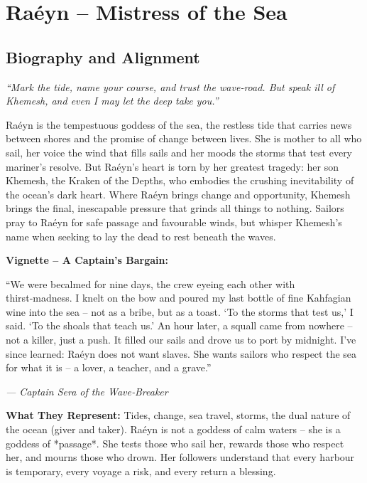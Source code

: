 \documentclass[10pt,a5paper]{book}
\begin{document}
\clearpage

\section{Raéyn – Mistress of the Sea}
\label{patron:raeyn}

\subsection*{Biography and Alignment}

\textit{“Mark the tide, name your course, and trust the wave‑road. But speak ill of Khemesh, and even I may let the deep take you.”}

Raéyn is the tempestuous goddess of the sea, the restless tide that carries news between shores and the promise of change between lives. She is mother to all who sail, her voice the wind that fills sails and her moods the storms that test every mariner’s resolve. But Raéyn’s heart is torn by her greatest tragedy: her son Khemesh, the Kraken of the Depths, who embodies the crushing inevitability of the ocean’s dark heart. Where Raéyn brings change and opportunity, Khemesh brings the final, inescapable pressure that grinds all things to nothing. Sailors pray to Raéyn for safe passage and favourable winds, but whisper Khemesh’s name when seeking to lay the dead to rest beneath the waves.

\textbf{Vignette – A Captain’s Bargain:}
\epigraph{“We were becalmed for nine days, the crew eyeing each other with thirst‑madness. I knelt on the bow and poured my last bottle of fine Kahfagian wine into the sea – not as a bribe, but as a toast. ‘To the storms that test us,’ I said. ‘To the shoals that teach us.’ An hour later, a squall came from nowhere – not a killer, just a push. It filled our sails and drove us to port by midnight. I’ve since learned: Raéyn does not want slaves. She wants sailors who respect the sea for what it is – a lover, a teacher, and a grave.”}{\textit{— Captain Sera of the Wave‑Breaker}}

\textbf{What They Represent:} Tides, change, sea travel, storms, the dual nature of the ocean (giver and taker). Raéyn is not a goddess of calm waters – she is a goddess of *passage*. She tests those who sail her, rewards those who respect her, and mourns those who drown. Her followers understand that every harbour is temporary, every voyage a risk, and every return a blessing.
\end{document}
